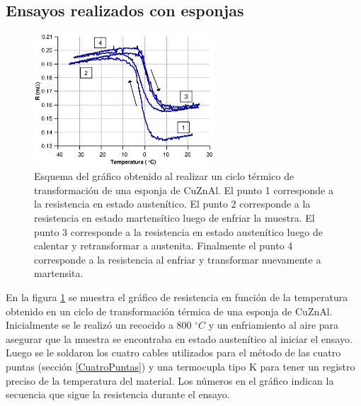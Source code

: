 \documentclass[a4paper,12pt,fleqn,twoside,openany]{book}
\begin{document}
% 
% 


% 

 
%  
  
  
\subsection{Ensayos realizados con esponjas}
 
 \begin{figure}[h]
 \centering
 \includegraphics[width=0.6\textwidth]{Img/Resultados/Resistencia/HistExplicacion.eps}
 \caption{Esquema del gráfico obtenido al realizar un ciclo térmico de transformación de una esponja de CuZnAl. El punto 1 corresponde a la resistencia en estado austenítico. El punto 2 corresponde a la resistencia en estado martensítico luego de enfriar la muestra. El punto 3 corresponde a la resistencia en estado austenítico luego de calentar y retransformar a austenita. Finalmente el punto 4 corresponde a la resistencia al enfriar y transformar nuevamente a martensita.} 
 \label{fig:HistExplicacion}
 \end{figure}

 
 En la figura \ref{fig:HistExplicacion} se muestra el gráfico de resistencia en función de la temperatura obtenido en un ciclo de transformación térmica de una esponja de CuZnAl. Inicialmente se le realizó un recocido a 800 $^\circ C$ y un enfriamiento al aire para asegurar que la muestra se encontraba en estado austenítico al iniciar el ensayo. Luego se le soldaron los cuatro cables utilizados para el método de las cuatro puntas (sección \ref{CuatroPuntas}) y una termocupla tipo K para tener un registro preciso de la temperatura del material. Los números en el gráfico indican la secuencia que sigue la resistencia durante el ensayo. 
 
\end{document}
